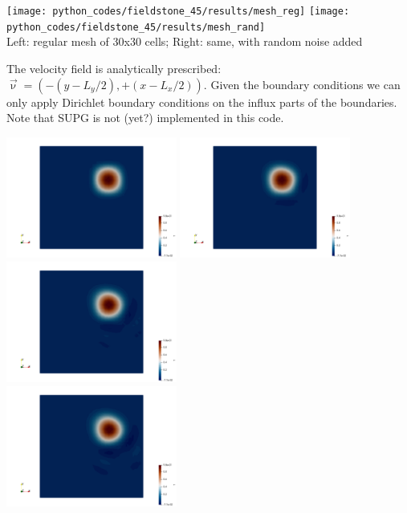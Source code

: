 \begin{center}
\texttt{[image: python\_codes/fieldstone\_45/results/mesh\_reg]}
\texttt{[image: python\_codes/fieldstone\_45/results/mesh\_rand]}\\
{\captionfont Left: regular mesh of 30x30 cells; Right: same, with random noise added}
\end{center}

The velocity field is analytically prescribed: $\vec\upnu=(-(y-L_y/2),+(x-L_x/2))$.
Given the boundary conditions we can only apply Dirichlet boundary conditions 
on the influx parts of the boundaries.
Note that SUPG is not (yet?) implemented in this code.
 
\begin{center}
\includegraphics[width=5.6cm]{python_codes/fieldstone_45/results/norandom/T.0000.png}
\includegraphics[width=5.6cm]{python_codes/fieldstone_45/results/norandom/T.0001.png}
\includegraphics[width=5.6cm]{python_codes/fieldstone_45/results/norandom/T.0002.png}\\
\includegraphics[width=5.6cm]{python_codes/fieldstone_45/results/norandom/T.0003.png}

\end{center}
